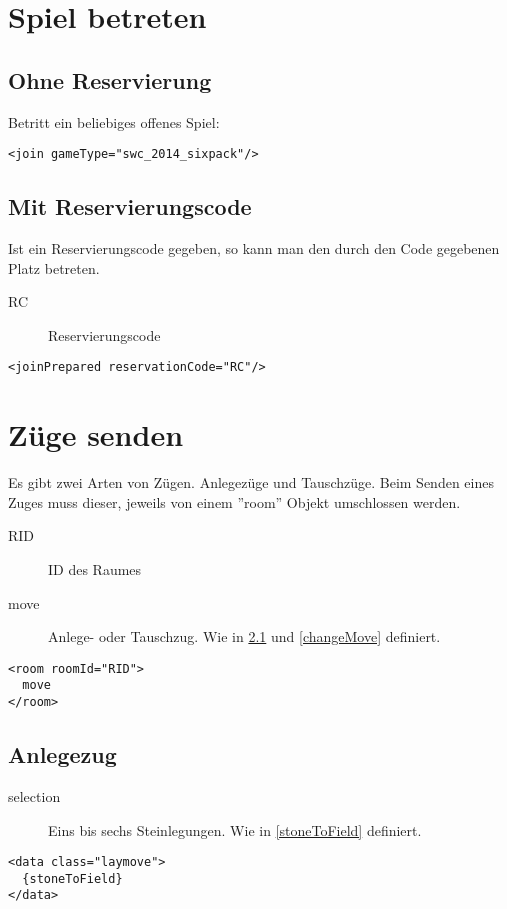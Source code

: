 \documentclass[12pt,a4paper, ngerman, oneside]{scrartcl}
\begin{document}
\section{Spiel betreten}
\subsection{Ohne Reservierung}
Betritt ein beliebiges offenes Spiel:
\begin{verbatim}
<join gameType="swc_2014_sixpack"/>
\end{verbatim}
\subsection{Mit Reservierungscode}
Ist ein Reservierungscode gegeben, so kann man den durch den Code gegebenen Platz betreten.
\begin{description}
\item[RC] Reservierungscode
\end{description}
\begin{verbatim}
<joinPrepared reservationCode="RC"/>
\end{verbatim}

\section{Züge senden}
Es gibt zwei Arten von Zügen. Anlegezüge und Tauschzüge. Beim Senden eines Zuges muss dieser, jeweils von einem ''room'' Objekt umschlossen werden.
\begin{description}
\item[RID] ID des Raumes
\item[move] Anlege- oder Tauschzug. Wie in \ref{layMove} und \ref{changeMove} definiert.
\end{description}
\begin{verbatim}
<room roomId="RID">
  move
</room>
\end{verbatim}
\subsection{Anlegezug}
\label{layMove}
\begin{description}
\item[selection] Eins bis sechs Steinlegungen. Wie in \ref{stoneToField} definiert.
\end{description}
\begin{verbatim}
<data class="laymove">
  {stoneToField}
</data>
\end{verbatim}
\end{document}

